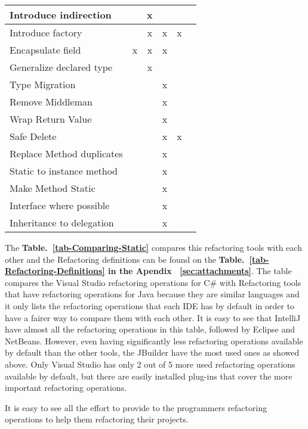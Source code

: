\begin{table}[htbp]
\begin{tabular}{|l|c|c|c|c|c|}
Introduce indirection     &               & x       &          &          &          \\ \hline
Introduce factory         &               & x       & x        & x        &          \\ \hline
Encapsulate field         & x             & x       & x        &          &          \\ \hline
Generalize declared type  &               & x       &          &          &          \\ \hline
Type Migration            &               &         & x        &          &          \\ \hline
Remove Middleman          &               &         & x        &          &          \\ \hline
Wrap Return Value         &               &         & x        &          &          \\ \hline
Safe Delete               &               &         & x        & x        &          \\ \hline
Replace Method duplicates &               &         & x        &          &          \\ \hline
Static to instance method &               &         & x        &          &          \\ \hline
Make Method Static        &               &         & x        &          &          \\ \hline
Interface where possible  &               &         & x        &          &          \\ \hline
Inheritance to delegation &               &         & x        &          &          \\ \hline
\end{tabular}
\end{table}


The {\bf Table.~\ref{tab-Comparing-Static}} compares this refactoring tools with each other and the Refactoring definitions can be found on the {\bf Table.~\ref{tab-Refactoring-Definitions} in the Apendix ~\ref{sec:attachments}}. 
The table compares the Visual Studio refactoring operations for C\# with Refactoring tools that have refactoring operations for Java because they are similar languages and it only lists the refactoring operations that each IDE has by default in order to have a fairer way to compare them with each other.
It is easy to see that IntelliJ have almost all the refactoring operations in this table, followed by Eclipse and NetBeans.
However, even having significantly less refactoring operations available by default than the other tools, the JBuilder have the most used ones as showed above.
Only Visual Studio has only 2 out of 5 more used refactoring operations available by default, but there are easily installed plug-ins that cover the more important refactoring operations. 

It is easy to see all the effort to provide to the programmers refactoring operations to help them refactoring their projects.

